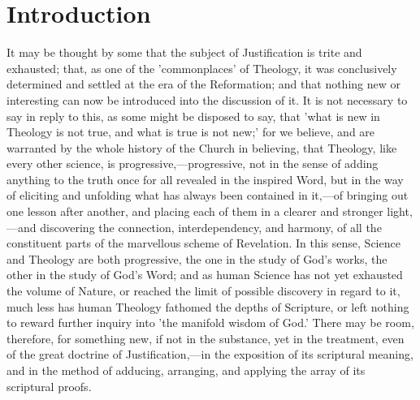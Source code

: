 \documentclass[
]{book}
\begin{document}
\clearpage
\setcounter{page}{1}

\hypertarget{introduction}{%
\chapter{Introduction}\label{introduction}}

It may be thought by some that the subject of Justification is trite and exhausted; that, as one of the 'commonplaces' of Theology, it was conclusively determined and settled at the era of the Reformation; and that nothing new or interesting can now be introduced into the discussion of it. It is not necessary to say in reply to this, as some might be disposed to say, that 'what is new in Theology is not true, and what is true is not new;' for we believe, and are warranted by the whole history of the Church in believing, that Theology, like every other science, is progressive,---progressive, not in the sense of adding anything to the truth once for all revealed in the inspired Word, but in the way of eliciting and unfolding what has always been contained in it,---of bringing out one lesson after another, and placing each of them in a clearer and stronger light,---and discovering the connection, interdependency, and harmony, of all the constituent parts of the marvellous scheme of Revelation. In this sense, Science and Theology are both progressive, the one in the study of God's works, the other in the study of God's Word; and as human Science has not yet exhausted the volume of Nature, or reached the limit of possible discovery in regard to it, much less has human Theology fathomed the depths of Scripture, or left nothing to reward further inquiry into 'the manifold wisdom of God.' There may be room, therefore, for something new, if not in the substance, yet in the treatment, even of the great doctrine of Justification,---in the exposition of its scriptural meaning, and in the method of adducing, arranging, and applying the array of its scriptural proofs.
\end{document}
